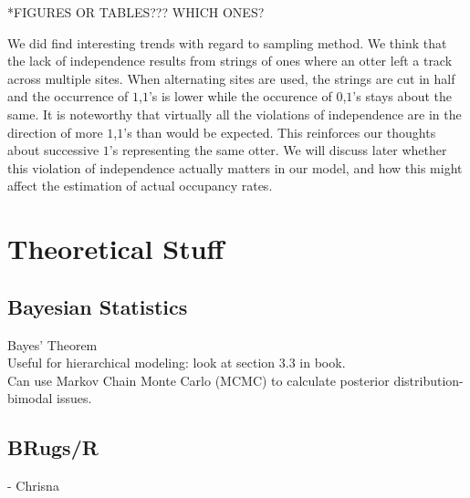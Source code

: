 \documentclass{article}
\begin{document}
*FIGURES OR TABLES??? WHICH ONES?

	We did find interesting trends with regard to sampling method.  We think 
that the lack of independence results from strings of ones where an otter left a
track across multiple sites.  When alternating sites are used, the strings are 
cut in half and the occurrence of \(1\),\(1\)'s is lower while the occurence of 
\(0\),\(1\)'s stays about the same.  It is noteworthy that virtually all the 
violations of independence are in the direction of more \(1\),\(1\)'s than would
be expected.  This reinforces our thoughts about successive \(1\)'s representing
the same otter.  We will discuss later whether this violation of independence 
actually matters in our model, and how this might affect the estimation of 
actual occupancy rates.

\section{Theoretical Stuff} 

	\subsection{Bayesian Statistics}
	   	Bayes' Theorem \\
    	Useful for hierarchical modeling: look at section 3.3 in book. \\
    	Can use Markov Chain Monte Carlo (MCMC) to calculate posterior 
			distribution- bimodal issues.
	
	\subsection{BRugs/R} - Chrisna
\end{document}

